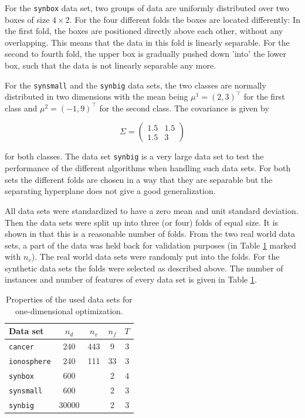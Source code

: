 For the \texttt{synbox} data set, two groups of data are uniformly distributed over two boxes of size \(4\times2\). For the four different folds the boxes are located differently: In the first fold, the boxes are positioned directly above each other, without any overlapping. This means that the data in this fold is linearly separable.
For the second to fourth fold, the upper box  is gradually pushed down 'into' the lower box, such that the data is not linearly separable any more.

For the \texttt{synsmall} and the \texttt{synbig} data sets,  the two classes are normally distributed in two dimensions with the mean being \(\mu^1 = (2,3)^{\top}\) for the first class and \(\mu^2 = (-1,9)^{\top}\) for the second class. The covariance is given by

 \[\Sigma = \begin{pmatrix}1.5 & 1.5\\1.5 & 3\end{pmatrix}\]

for both classes. 
The data set \texttt{synbig} is a very large data set to test the performance of the different algorithms when handling such data sets.
For both sets the different folds are chosen in a way that they are separable but the separating hyperplane does not give a good generalization.

All data sets were standardized to have a zero mean and unit standard deviation. Then the data sets were split up into three (or four) folds of equal size. It is shown in \cite[p. 47]{Kunapuli2008} that this is a reasonable number of folds.
From the two real world data sets, a part of the data was held back for validation purposes (in Table \ref{tab_set_props} marked with \(n_v\)).
The real world data sets were randomly put into the folds. For the synthetic data sets the folds were selected as described above. The number of instances and number of features of every data set is given in Table \ref{tab_set_props}. 

\begin{center}
\begin{table}[H]%
	\begin{tabular}{|lcccc|}
		\hline
    Data set & \(n_d\) & \(n_v\) &  \(n_f\) & \(T\) \\
		\hline
		\texttt{cancer} & 240 & 443 & 9 & 3 \\
		\texttt{ionosphere} & 240 & 111 & 33 & 3 \\
		\texttt{synbox} & 600 && 2 & 4 \\
		\texttt{synsmall} & 600 && 2 & 3 \\
		\texttt{synbig} & 30000 && 2 & 3 \\
		\hline
	\end{tabular}
	\caption[Properties of data sets, 1D]{Properties of the used data sets for one-dimensional optimization.}
	\label{tab_set_props}
\end{table}
\end{center}

